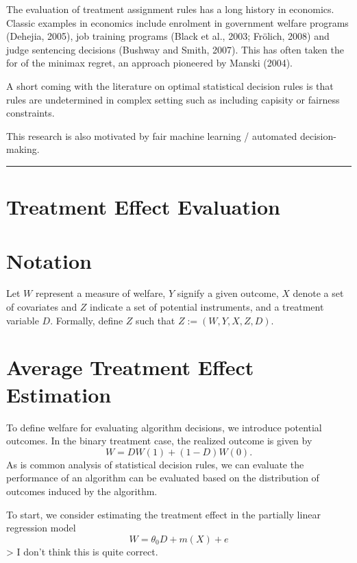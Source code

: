 \documentclass[
]{article}
\begin{document}
The evaluation of treatment assignment rules has a long history in
economics. Classic examples in economics include enrolment in government
welfare programs (Dehejia, 2005), job training programs (Black et al.,
2003; Frölich, 2008) and judge sentencing decisions (Bushway and Smith,
2007). This has often taken the for of the minimax regret, an approach
pioneered by Manski (2004).

A short coming with the literature on optimal statistical decision rules
is that rules are undetermined in complex setting such as including
capisity or fairness constraints.

This research is also motivated by fair machine learning / automated
decision-making.

\begin{center}\rule{0.5\linewidth}{0.5pt}\end{center}

\section{Treatment Effect Evaluation}\label{treatment-effect-evaluation}

\section{Notation}\label{notation}

Let \(W\) represent a measure of welfare, \(Y\) signify a given outcome,
\(X\) denote a set of covariates and \(Z\) indicate a set of potential
instruments, and a treatment variable \(D\). Formally, define \(Z\) such
that \(Z := (W, Y, X, Z, D)\).

\section{Average Treatment Effect
Estimation}\label{average-treatment-effect-estimation}

To define welfare for evaluating algorithm decisions, we introduce
potential outcomes. In the binary treatment case, the realized outcome
is given by \[
W = D W(1) + (1-D)W(0).
\] As is common analysis of statistical decision rules, we can evaluate
the performance of an algorithm can be evaluated based on the
distribution of outcomes induced by the algorithm.

To start, we consider estimating the treatment effect in the partially
linear regression model \[
W = \theta_{0}D + m(X) + e
\] \textgreater{} I don't think this is quite correct.
\end{document}
